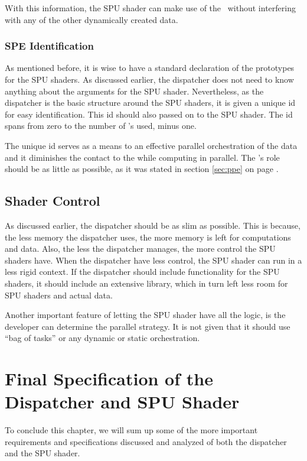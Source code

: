 With this information, the SPU shader can make use of the \LS\ without
interfering with any of the other dynamically created data.

\subsubsection{SPE Identification}

As mentioned before, it is wise to have a standard declaration of the
prototypes for the SPU shaders. As discussed earlier, the dispatcher
does not need to know anything about the arguments for the SPU
shader. Nevertheless, as the dispatcher is the basic structure around
the SPU shaders, it is given a unique id for easy identification. This
id should also passed on to the SPU shader. The id spans from zero to
the number of \SPE{}'s used, minus one.

The unique id serves as a means to an effective parallel orchestration
of the data and it diminishes the contact to the \PPE{} while
computing in parallel. The \PPE{}'s role should be as little as
possible, as it was stated in section \ref{sec:ppe} on
page \pageref{sec:ppe}.

\subsection{Shader Control}

As discussed earlier, the dispatcher should be as slim as
possible. This is because, the less memory the dispatcher uses, the
more memory is left for computations and data. Also, the less the
dispatcher manages, the more control the SPU shaders have. When the
dispatcher have less control, the SPU shader can run in a less rigid
context. If the dispatcher should include functionality for the SPU
shaders, it should include an extensive library, which in turn left
less room for SPU shaders and actual data.

Another important feature of letting the SPU shader have all the
logic, is the developer can determine the parallel strategy. It is not
given that it should use ``bag of tasks'' or any dynamic or static
orchestration.

\section{Final Specification of the Dispatcher and SPU Shader}
\label{sec:specs}

To conclude this chapter, we will sum up some of the more important
requirements and specifications discussed and analyzed of both the
dispatcher and the SPU shader.

